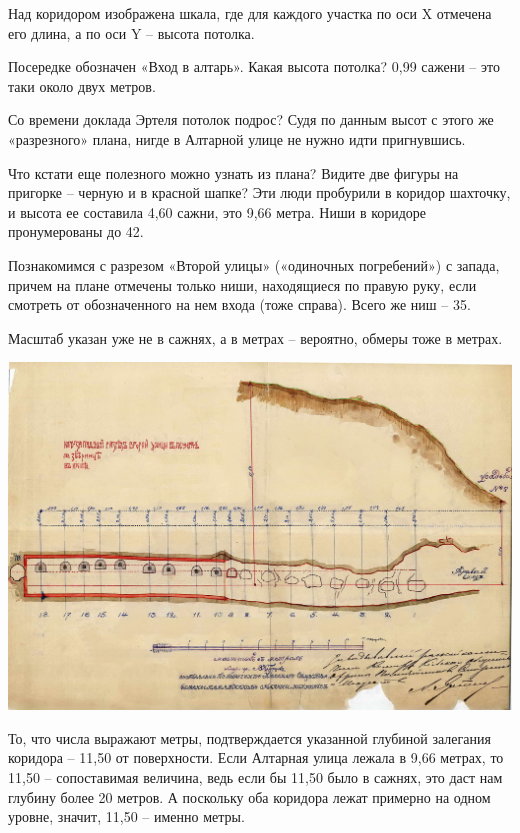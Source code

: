 Над коридором изображена шкала, где для каждого участка по оси X отмечена его длина, а по оси Y – высота потолка.

Посередке обозначен «Вход в алтарь». Какая высота потолка? 0,99 сажени – это таки около двух метров.

Со времени доклада Эртеля потолок подрос? Судя по данным высот с этого же «разрезного» плана, нигде в Алтарной улице не нужно идти пригнувшись.

Что кстати еще полезного можно узнать из плана? Видите две фигуры на пригорке – черную и в красной шапке? Эти люди пробурили в коридор шахточку, и высота ее составила 4,60 сажни, это 9,66 метра. Ниши в коридоре пронумерованы до 42.

Познакомимся с разрезом «Второй улицы» («одиночных погребений») с запада, причем на плане отмечены только ниши, находящиеся по правую руку, если смотреть от обозначенного на нем входа (тоже справа). Всего же ниш – 35.

Масштаб указан уже не в сажнях, а в метрах – вероятно, обмеры тоже в метрах.

\begin{center}
\includegraphics[width=\linewidth]{chast-colebanie-osnov/nachalo/1914-02.jpg}
\end{center}

То, что числа выражают метры, подтверждается указанной глубиной залегания коридора – 11,50 от поверхности. Если Алтарная улица лежала в 9,66 метрах, то 11,50 – сопоставимая величина, ведь если бы 11,50 было в сажнях, это даст нам глубину более 20 метров. А поскольку оба коридора лежат примерно на одном уровне, значит, 11,50 – именно метры.

